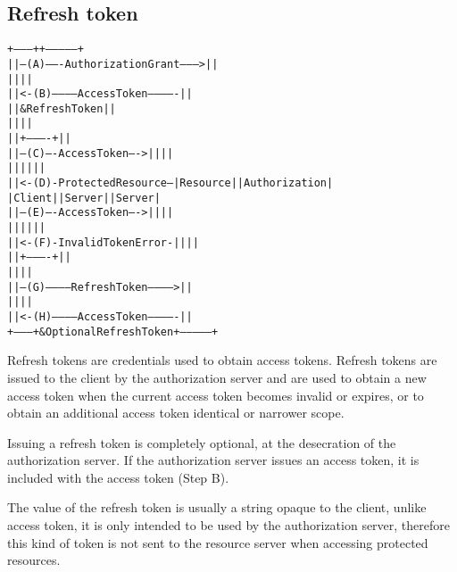 \subsection{Refresh token}
\begin{alltt}
  +--------+                                           +---------------+
  |        |--(A)------- Authorization Grant --------->|               |
  |        |                                           |               |
  |        |<-(B)----------- Access Token -------------|               |
  |        |               & Refresh Token             |               |
  |        |                                           |               |
  |        |                            +----------+   |               |
  |        |--(C)---- Access Token ---->|          |   |               |
  |        |                            |          |   |               |
  |        |<-(D)- Protected Resource --| Resource |   | Authorization |
  | Client |                            |  Server  |   |     Server    |
  |        |--(E)---- Access Token ---->|          |   |               |
  |        |                            |          |   |               |
  |        |<-(F)- Invalid Token Error -|          |   |               |
  |        |                            +----------+   |               |
  |        |                                           |               |
  |        |--(G)----------- Refresh Token ----------->|               |
  |        |                                           |               |
  |        |<-(H)----------- Access Token -------------|               |
  +--------+           & Optional Refresh Token        +---------------+
\end{alltt}

Refresh tokens are credentials used to obtain access tokens. Refresh tokens are
issued to the client by the authorization server and are used to obtain a new
access token when the current access token becomes invalid or expires, or to
obtain an additional access token identical or narrower scope.

Issuing a refresh token is completely optional, at the desecration of the
authorization server.
If the authorization server issues an access token, it is included with the
access token (Step B).

The value of the refresh token is usually a string opaque to the client, unlike
access token, it is only intended to be used by the authorization server,
therefore this kind of token is not sent to the resource server when accessing
protected resources.


